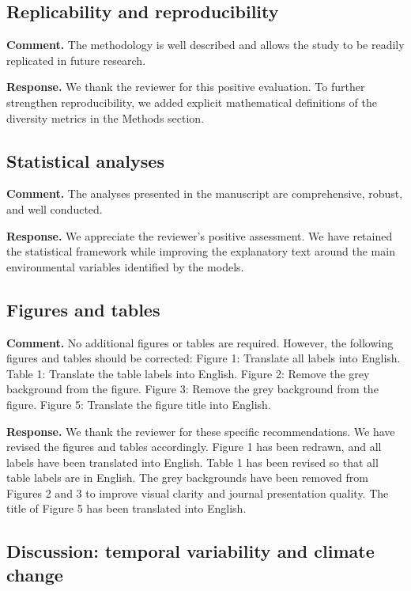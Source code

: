 \documentclass[12pt]{article}
\newcommand{\reviewercomment}[1]{%
\vspace{0.3em}
\noindent\textbf{Comment.} \textcolor{commentblue}{#1}\par
}
\newcommand{\authorresponse}[1]{%
\vspace{0.3em}
\noindent\textbf{Response.} \textcolor{responsegreen}{#1}\par
\vspace{0.8em}
}
\begin{document}
\subsection{Replicability and reproducibility}

\reviewercomment{The methodology is well described and allows the study to be readily replicated in future research.}

\authorresponse{We thank the reviewer for this positive evaluation. To further strengthen reproducibility, we added explicit mathematical definitions of the diversity metrics in the Methods section.}

\subsection{Statistical analyses}

\reviewercomment{The analyses presented in the manuscript are comprehensive, robust, and well conducted.}

\authorresponse{We appreciate the reviewer's positive assessment. We have retained the statistical framework while improving the explanatory text around the main environmental variables identified by the models.}

\subsection{Figures and tables}

\reviewercomment{No additional figures or tables are required. However, the following figures and tables should be corrected: Figure 1: Translate all labels into English. Table 1: Translate the table labels into English. Figure 2: Remove the grey background from the figure. Figure 3: Remove the grey background from the figure. Figure 5: Translate the figure title into English.}

\authorresponse{We thank the reviewer for these specific recommendations. We have revised the figures and tables accordingly. Figure 1 has been redrawn, and all labels have been translated into English. Table 1 has been revised so that all table labels are in English. The grey backgrounds have been removed from Figures 2 and 3 to improve visual clarity and journal presentation quality. The title of Figure 5 has been translated into English.}

\subsection{Discussion: temporal variability and climate change}
\end{document}
